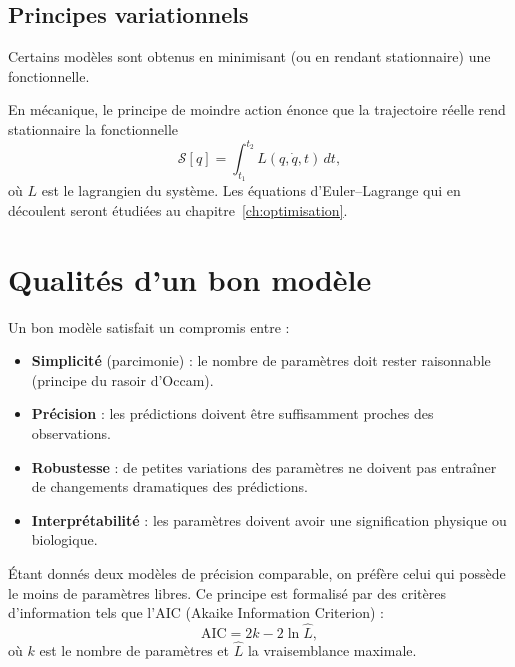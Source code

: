\subsection{Principes variationnels}

Certains mod\`eles sont obtenus en minimisant (ou en rendant stationnaire)
une fonctionnelle.

\begin{definition}
En m\'ecanique, le principe de moindre action \'enonce que la trajectoire
r\'eelle rend stationnaire la fonctionnelle
\[
  \mathcal{S}[q] = \int_{t_1}^{t_2} L(q,\dot{q},t)\,dt,
\]
o\`u $L$ est le lagrangien du syst\`eme.  Les \'equations d'Euler--Lagrange
qui en d\'ecoulent seront \'etudi\'ees au chapitre~\ref{ch:optimisation}.
\end{definition}

\section{Qualit\'es d'un bon mod\`ele}

\begin{bonnepratique}[title=\textbf{Crit\`eres de qualit\'e}]
Un bon mod\`ele satisfait un compromis entre :
\begin{itemize}
  \item \textbf{Simplicit\'e} (parcimonie) : le nombre de param\`etres
    doit rester raisonnable (principe du rasoir d'Occam).
  \item \textbf{Pr\'ecision} : les pr\'edictions doivent \^etre
    suffisamment proches des observations.
  \item \textbf{Robustesse} : de petites variations des param\`etres
    ne doivent pas entra\^iner de changements dramatiques des pr\'edictions.
  \item \textbf{Interpr\'etabilit\'e} : les param\`etres doivent avoir
    une signification physique ou biologique.
\end{itemize}
\end{bonnepratique}

\begin{proposition}
\'Etant donn\'es deux mod\`eles de pr\'ecision comparable, on pr\'ef\`ere
celui qui poss\`ede le moins de param\`etres libres.  Ce principe est
formalis\'e par des crit\`eres d'information tels que l'AIC (Akaike
Information Criterion) :
\[
  \mathrm{AIC} = 2k - 2\ln \hat{L},
\]
o\`u $k$ est le nombre de param\`etres et $\hat{L}$ la vraisemblance
maximale.
\end{proposition}

